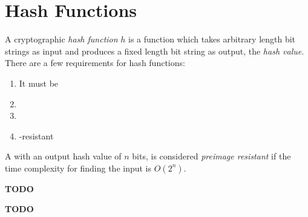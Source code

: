 \section{Hash Functions}\label{sec:Hash_Functions}
\begin{definition}\label{def:Hash_Function}
  A cryptographic \emph{hash function} $h$ is a function which takes arbitrary length bit strings as input and produces a fixed length bit string as output, the \emph{hash value}.
  There are a few requirements for hash functions:
  \begin{enumerate}[noitemsep]
  \item It must be 
  \item {}
  \item {}
  \item {}-resistant
  \end{enumerate}
\end{definition}

\begin{definition}\label{def:Preimage_Resistant}
  A  with an output hash value of $n$ bits, is considered \emph{preimage resistant} if the time complexity for finding the input is $O(2^{n})$.
\end{definition}

\begin{definition}\label{def:Second_Preimage_Resistant}
  \textbf{TODO}
\end{definition}

\begin{definition}[Collision]\label{def:Collision}
  \textbf{TODO}
\end{definition}

